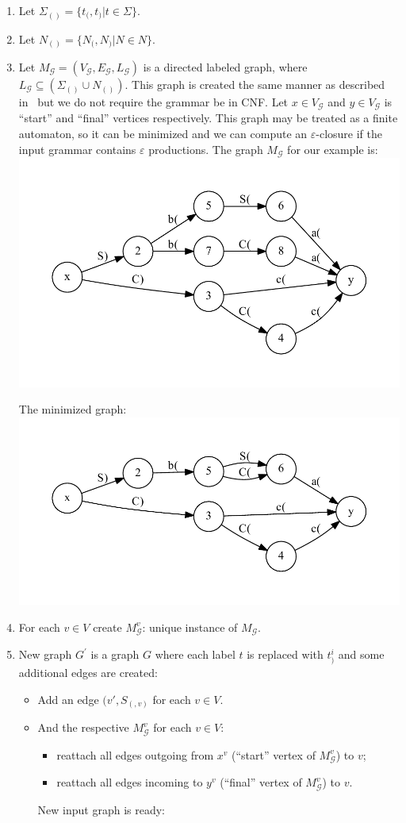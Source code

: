 \begin{enumerate}
\item Let $\Sigma_{()} =\{ t_( , t_)  | t \in \Sigma \}$.
\item Let $N_{()} = \{ N_( , N_) | N \in N  \}$.
\item Let $M_{\mathcal{G}} = (V_{\mathcal{G}}, E_{\mathcal{G}}, L_{\mathcal{G}})$ is a directed 
labeled graph, where $L_{\mathcal{G}} \subseteq (\Sigma_{()} \cup N_{()})$.
This graph is created the same manner as described in~\cite{OptimalDLR} but we do not require the grammar be in CNF.
Let $x \in V_{\mathcal{G}}$ and $y \in V_{\mathcal{G}}$ is ``start'' and ``final'' vertices respectively. 
This graph may be treated as a finite automaton, so it can be minimized and we can compute an $\varepsilon$-closure if the input grammar contains $\varepsilon$ productions.
The graph $M_{\mathcal{G}}$ for our example is:
\\
\includegraphics[width=.7\textwidth]{dot/grammar_1.pdf}


The minimized graph:
\\
\includegraphics[width=.7\textwidth]{dot/grammar_min.pdf}


\item For each $v \in V$ create $M_{\mathcal{G}}^v$: unique instance of $M_{\mathcal{G}}$.
\item New graph $G^{'}$ is a graph $G$ where each label $t$ is replaced with $t_{)}^i$ and some additional edges are created:
\begin{itemize}
\item Add an edge $(v', S_(, v)$ for each $v \in V$. 
\item And the respective $M_{\mathcal{G}}^v$ for each $v \in V$:
  \begin{itemize}
    \item reattach all edges outgoing from $x^v$ (``start'' vertex of $M_{\mathcal{G}}^v$) to $v$;
    \item reattach all edges incoming to $y^v$ (``final'' vertex of $M_{\mathcal{G}}^v$) to $v$.    
  \end{itemize}
  New input graph is ready:


\end{itemize}
\end{enumerate}
